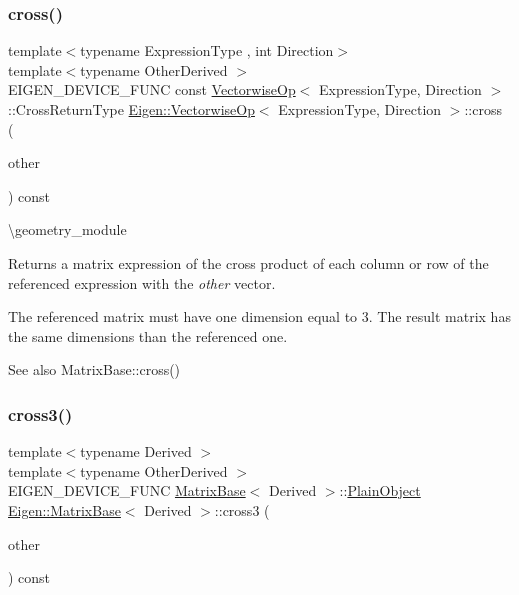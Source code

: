 \subsubsection{\texorpdfstring{cross()}{cross()}\hspace{0.1cm}{\footnotesize\ttfamily [2/2]}}
{\footnotesize\ttfamily template$<$typename Expression\+Type , int Direction$>$ \\
template$<$typename Other\+Derived $>$ \\
E\+I\+G\+E\+N\+\_\+\+D\+E\+V\+I\+C\+E\+\_\+\+F\+U\+NC const \mbox{\hyperlink{class_eigen_1_1_vectorwise_op}{Vectorwise\+Op}}$<$ Expression\+Type, Direction $>$\+::Cross\+Return\+Type \mbox{\hyperlink{class_eigen_1_1_vectorwise_op}{Eigen\+::\+Vectorwise\+Op}}$<$ Expression\+Type, Direction $>$\+::cross (\begin{DoxyParamCaption}\item[{const \mbox{\hyperlink{class_eigen_1_1_matrix_base}{Matrix\+Base}}$<$ Other\+Derived $>$ \&}]{other }\end{DoxyParamCaption}) const}

\textbackslash{}geometry\+\_\+module

\begin{DoxyReturn}{Returns}
a matrix expression of the cross product of each column or row of the referenced expression with the {\itshape other} vector.
\end{DoxyReturn}
The referenced matrix must have one dimension equal to 3. The result matrix has the same dimensions than the referenced one.

\begin{DoxySeeAlso}{See also}
Matrix\+Base\+::cross() 
\end{DoxySeeAlso}
\mbox{\label{group___geometry___module_gaf10988c8393785423ae68a5afdf83226}} 
\subsubsection{\texorpdfstring{cross3()}{cross3()}}
{\footnotesize\ttfamily template$<$typename Derived $>$ \\
template$<$typename Other\+Derived $>$ \\
E\+I\+G\+E\+N\+\_\+\+D\+E\+V\+I\+C\+E\+\_\+\+F\+U\+NC \mbox{\hyperlink{class_eigen_1_1_matrix_base}{Matrix\+Base}}$<$ Derived $>$\+::\mbox{\hyperlink{class_eigen_1_1_dense_base_aae45af9b5aca5a9caae98fd201f47cc4}{Plain\+Object}} \mbox{\hyperlink{class_eigen_1_1_matrix_base}{Eigen\+::\+Matrix\+Base}}$<$ Derived $>$\+::cross3 (\begin{DoxyParamCaption}\item[{const \mbox{\hyperlink{class_eigen_1_1_matrix_base}{Matrix\+Base}}$<$ Other\+Derived $>$ \&}]{other }\end{DoxyParamCaption}) const\hspace{0.3cm}{\ttfamily [inline]}}

